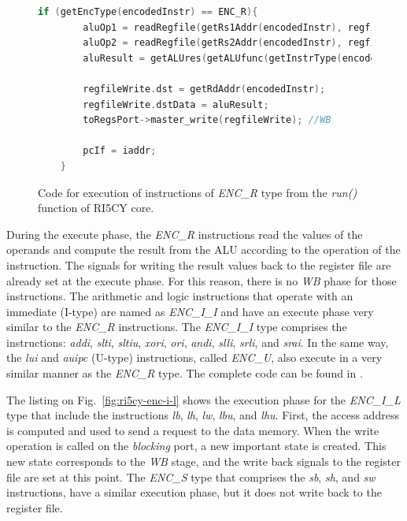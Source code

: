 \begin{figure}[htb!]
    \begin{lstlisting}[language=c++]
    if (getEncType(encodedInstr) == ENC_R){
        aluOp1 = readRegfile(getRs1Addr(encodedInstr), regfile);
        aluOp2 = readRegfile(getRs2Addr(encodedInstr), regfile);
        aluResult = getALUres(getALUfunc(getInstrType(encodedInstr)), aluOp1, aluOp2);
        
        regfileWrite.dst = getRdAddr(encodedInstr);
        regfileWrite.dstData = aluResult;
        toRegsPort->master_write(regfileWrite); //WB
        
        pcIf = iaddr;
    }\end{lstlisting}
    \caption{Code for execution of instructions of \textit{ENC\_R} type from the \textit{run()} function of RI5CY core.}
    \label{fig:ri5cy-enc-r}
\end{figure}

During the execute phase, the \textit{ENC\_R} instructions read the values of the operands and compute the result from the ALU according to the operation of the instruction. The signals for writing the result values back to the register file are already set at the execute phase. For this reason, there is no \textit{WB} phase for those instructions. The arithmetic and logic instructions that operate with an immediate (I-type) are named as \textit{ENC\_I\_I} and have an execute phase very similar to the \textit{ENC\_R} instructions. The \textit{ENC\_I\_I} type comprises the instructions: \textit{addi}, \textit{slti}, \textit{sltiu}, \textit{xori}, \textit{ori}, \textit{andi}, \textit{slli}, \textit{srli}, and \textit{srai}. In the same way, the \textit{lui} and \textit{auipc} (U-type) instructions, called \textit{ENC\_U}, also execute in a very similar manner as the \textit{ENC\_R} type. The complete code can be found in \cite{descam}.

The listing on Fig.~\ref{fig:ri5cy-enc-i-l} shows the execution phase for the \textit{ENC\_I\_L} type that include the instructions \textit{lb}, \textit{lh}, \textit{lw}, \textit{lbu}, and \textit{lhu}. First, the access address is computed and used to send a request to the data memory. When the write operation is called on the \textit{blocking} port, a new important state is created. This new state corresponds to the \textit{WB} stage, and the write back signals to the register file are set at this point. The \textit{ENC\_S} type that comprises the \textit{sb}, \textit{sh}, and \textit{sw} instructions, have a similar execution phase, but it does not write back to the register file. 

